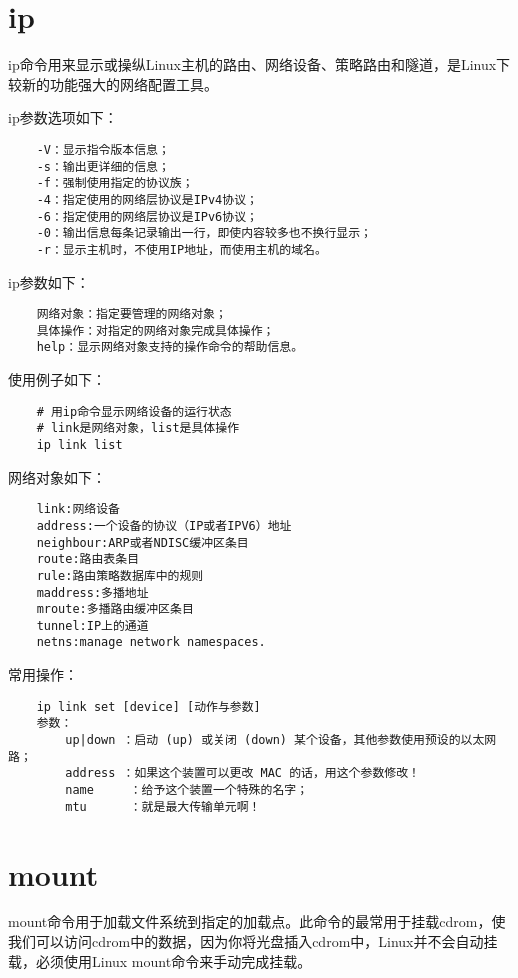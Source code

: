 \documentclass[a4paper,left=2.5cm,right=2.5cm,11pt]{article}
\begin{document}
\section{ip}
	ip命令用来显示或操纵Linux主机的路由、网络设备、策略路由和隧道，是Linux下较新的功能强大的网络配置工具。\par

	ip参数选项如下：
	\begin{lstlisting}
	-V：显示指令版本信息； 
	-s：输出更详细的信息； 
	-f：强制使用指定的协议族； 
	-4：指定使用的网络层协议是IPv4协议； 
	-6：指定使用的网络层协议是IPv6协议； 
	-0：输出信息每条记录输出一行，即使内容较多也不换行显示； 
	-r：显示主机时，不使用IP地址，而使用主机的域名。
	\end{lstlisting}

	ip参数如下：
	\begin{lstlisting}
	网络对象：指定要管理的网络对象； 
	具体操作：对指定的网络对象完成具体操作； 
	help：显示网络对象支持的操作命令的帮助信息。
	\end{lstlisting}

	使用例子如下：
	\begin{lstlisting}
	# 用ip命令显示网络设备的运行状态
	# link是网络对象，list是具体操作
	ip link list
	\end{lstlisting}

	网络对象如下：
	\begin{lstlisting}
	link:网络设备
	address:一个设备的协议（IP或者IPV6）地址
	neighbour:ARP或者NDISC缓冲区条目
	route:路由表条目
	rule:路由策略数据库中的规则
	maddress:多播地址
	mroute:多播路由缓冲区条目
	tunnel:IP上的通道
	netns:manage network namespaces.
	\end{lstlisting}

	常用操作：
	\begin{lstlisting}
	ip link set [device] [动作与参数]
	参数：
		up|down ：启动 (up) 或关闭 (down) 某个设备，其他参数使用预设的以太网路；
		address ：如果这个装置可以更改 MAC 的话，用这个参数修改！
		name     ：给予这个装置一个特殊的名字；
		mtu      ：就是最大传输单元啊！
	\end{lstlisting}

\section{mount}
	mount命令用于加载文件系统到指定的加载点。此命令的最常用于挂载cdrom，使我们可以访问cdrom中的数据，因为你将光盘插入cdrom中，Linux并不会自动挂载，必须使用Linux mount命令来手动完成挂载。\par
\end{document}
